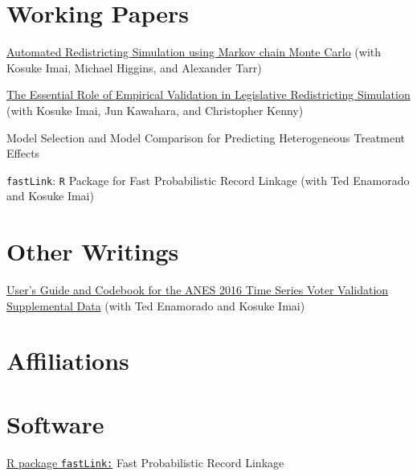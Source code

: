 \documentclass[]{deedy-resume-openfont}
\begin{document}
\section{Working Papers}
\href{https://imai.fas.harvard.edu/research/files/redist.pdf}{Automated Redistricting Simulation using Markov chain Monte Carlo} (with Kosuke Imai, Michael Higgins, and Alexander Tarr)\\\vspace{2mm}

\href{https://imai.fas.harvard.edu/research/files/enumerate.pdf}{The Essential Role of Empirical Validation in Legislative Redistricting Simulation} (with Kosuke Imai, Jun Kawahara, and Christopher Kenny)\\\vspace{2mm}

Model Selection and Model Comparison for Predicting Heterogeneous Treatment Effects\\\vspace{2mm}

\texttt{fastLink}: \texttt{R} Package for Fast Probabilistic Record Linkage (with Ted Enamorado and Kosuke Imai)\\\vspace{2mm}
\sectionsep

\section{Other Writings}
\href{https://www.electionstudies.org/wp-content/uploads/2018/03/anes_timeseries_2016voteval_userguidecodebook.pdf}{User’s Guide and Codebook for the ANES 2016 Time Series Voter Validation Supplemental Data} (with Ted Enamorado and Kosuke Imai)
\sectionsep

\section{Affiliations}
\sectionsep

\section{Software}
\href{https://github.com/kosukeimai/fastLink}{R package \texttt{fastLink:}} Fast Probabilistic Record Linkage \\\vspace{2mm}
\end{document}
